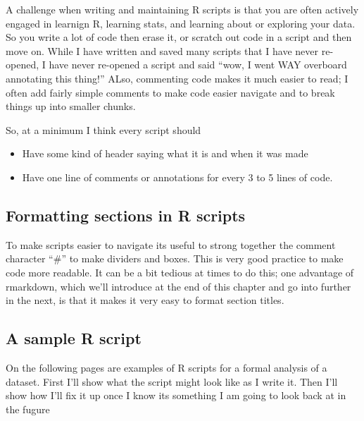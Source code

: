 \documentclass[]{book}
\providecommand{\tightlist}{%
  \setlength{\itemsep}{0pt}\setlength{\parskip}{0pt}}
\theoremstyle{definition}
\theoremstyle{definition}
\theoremstyle{definition}
\theoremstyle{remark}
\begin{document}
A challenge when writing and maintaining R scripts is that you are often
actively engaged in learnign R, learning stats, and learning about or
exploring your data. So you write a lot of code then erase it, or
scratch out code in a script and then move on. While I have written and
saved many scripts that I have never re-opened, I have never re-opened a
script and said ``wow, I went WAY overboard annotating this thing!''
ALso, commenting code makes it much easier to read; I often add fairly
simple comments to make code easier navigate and to break things up into
smaller chunks.

So, at a minimum I think every script should

\begin{itemize}
\tightlist
\item
  Have some kind of header saying what it is and when it was made
\item
  Have one line of comments or annotations for every 3 to 5 lines of
  code.
\end{itemize}

\subsection{Formatting sections in R
scripts}\label{formatting-sections-in-r-scripts}

To make scripts easier to navigate its useful to strong together the
comment character ``\#'' to make dividers and boxes. This is very good
practice to make code more readable. It can be a bit tedious at times to
do this; one advantage of rmarkdown, which we'll introduce at the end of
this chapter and go into further in the next, is that it makes it very
easy to format section titles.

\subsection{A sample R script}\label{a-sample-r-script}

On the following pages are examples of R scripts for a formal analysis
of a dataset. First I'll show what the script might look like as I write
it. Then I'll show how I'll fix it up once I know its something I am
going to look back at in the fugure
\end{document}
